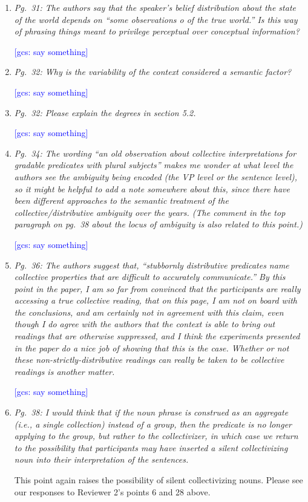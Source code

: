 \documentclass[12pt]{article}
\newcommand{\gcs}[1]{\textcolor{blue}{[gcs: #1]}}
\begin{document}
\begin{enumerate}
\gcs{say something}

\item \emph{Pg.~31: The authors say that the speaker's belief distribution about the state of the world depends on ``some observations o of the true world.'' Is this way of phrasing things meant to privilege perceptual over conceptual information?}

\gcs{say something}

\item \emph{Pg.~32: Why is the variability of the context considered a semantic factor?} 

\gcs{say something}

\item \emph{Pg.~32: Please explain the degrees in section 5.2.}

\gcs{say something}

\item \emph{Pg.~34: The wording ``an old observation about collective interpretations for gradable predicates with plural subjects'' makes me wonder at what level the authors see the ambiguity being encoded (the VP level or the sentence level), so it might be helpful to add a note somewhere about this, since there have been different approaches to the semantic treatment of the collective/distributive ambiguity over the years. (The comment in the top paragraph on pg.~38 about the locus of ambiguity is also related to this point.)}

\gcs{say something}

\item \emph{Pg.~36: The authors suggest that, ``stubbornly distributive predicates name collective properties that are difficult to accurately communicate.'' By this point in the paper, I am so far from convinced that the participants are really accessing a true collective reading, that on this page, I am not on board with the conclusions, and am certainly not in agreement with this claim, even though I do agree with the authors that the context is able to bring out readings that are otherwise suppressed, and I think the experiments presented in the paper do a nice job of showing that this is the case. Whether or not these non-strictly-distributive readings can really be taken to be collective readings is another matter.}

\gcs{say something}

\item \emph{Pg.~38: I would think that if the noun phrase is construed as an aggregate (i.e., a single collection) instead of a group, then the predicate is no longer applying to the group, but rather to the collectivizer, in which case we return to the possibility that participants may have inserted a silent collectivizing noun into their interpretation of the sentences.}

This point again raises the possibility of silent collectivizing nouns. Please see our responses to Reviewer 2's points 6 and 28 above.

\end{enumerate}
\end{document}
